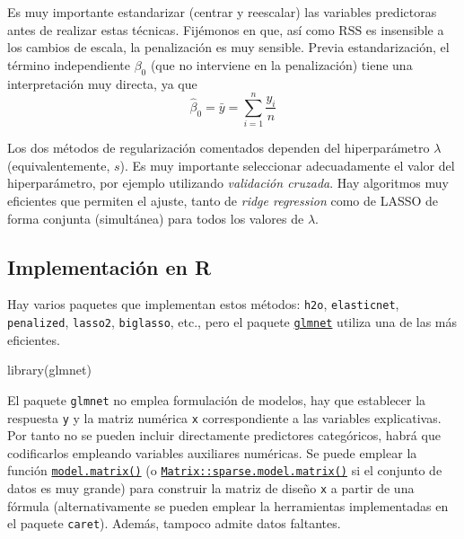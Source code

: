 \documentclass[
]{book}
\newenvironment{Shaded}{\begin{snugshade}}{\end{snugshade}}
\newcommand{\FunctionTok}[1]{\textcolor[rgb]{0.00,0.00,0.00}{#1}}
\newcommand{\NormalTok}[1]{#1}
\theoremstyle{break}
\theoremstyle{nonumberplain}
\begin{document}
Es muy importante estandarizar (centrar y reescalar) las variables predictoras antes de realizar estas técnicas.
Fijémonos en que, así como \(\mbox{RSS}\) es insensible a los cambios de escala, la penalización es muy sensible.
Previa estandarización, el término independiente \(\beta_0\) (que no interviene en la penalización) tiene una interpretación muy directa, ya que
\[\widehat \beta_0 = \bar y =\sum_{i=1}^n \frac{y_i}{n}\]

Los dos métodos de regularización comentados dependen del hiperparámetro \(\lambda\) (equivalentemente, \(s\)).
Es muy importante seleccionar adecuadamente el valor del hiperparámetro, por ejemplo utilizando \emph{validación cruzada}.
Hay algoritmos muy eficientes que permiten el ajuste, tanto de \emph{ridge regression} como de LASSO de forma conjunta (simultánea) para todos los valores de \(\lambda\).

\hypertarget{implementaciuxf3n-en-r}{%
\subsection{Implementación en R}\label{implementaciuxf3n-en-r}}

Hay varios paquetes que implementan estos métodos: \texttt{h2o}, \texttt{elasticnet}, \texttt{penalized}, \texttt{lasso2}, \texttt{biglasso}, etc., pero el paquete \href{https://glmnet.stanford.edu}{\texttt{glmnet}} utiliza una de las más eficientes.

\begin{Shaded}
\begin{Highlighting}[]
\FunctionTok{library}\NormalTok{(glmnet)}
\end{Highlighting}
\end{Shaded}

El paquete \texttt{glmnet} no emplea formulación de modelos, hay que establecer la respuesta \texttt{y} y la matriz numérica \texttt{x} correspondiente a las variables explicativas.
Por tanto no se pueden incluir directamente predictores categóricos, habrá que codificarlos empleando variables auxiliares numéricas.
Se puede emplear la función \href{https://rdrr.io/r/stats/model.matrix.html}{\texttt{model.matrix()}} (o \href{https://rdrr.io/pkg/Matrix/man/sparse.model.matrix.html}{\texttt{Matrix::sparse.model.matrix()}} si el conjunto de datos es muy grande) para construir la matriz de diseño \texttt{x} a partir de una fórmula (alternativamente se pueden emplear la herramientas implementadas en el paquete \texttt{caret}).
Además, tampoco admite datos faltantes.
\end{document}
